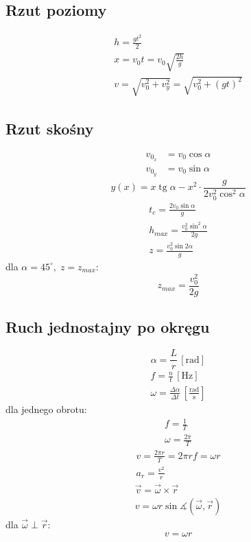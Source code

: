 \documentclass{article}
\numberwithin{equation}{section}
\DeclareMathOperator{\tg}{tg}
\newcommand{\unit}[1]{\, \left[\mathrm{#1}\right]}
\begin{document}
    \subsection{Rzut poziomy}
      \begin{gather}
        h = \frac{gt^2}{2}\\
        x = v_0t = v_0\sqrt{\frac{2h}{g}}\\
        v = \sqrt{v_0^2 + v_y^2} = \sqrt{v_0^2 + (gt)^2}
      \end{gather}
    \subsection{Rzut skośny}
      \begin{align}
        v_{0_x} &= v_0\cos\alpha\\
        v_{0_y} &= v_0\sin\alpha
      \end{align}
      \begin{equation}
        y(x) = x\tg\alpha - x^2\cdot \frac{g}{2v_0^2\cos^2\alpha}
      \end{equation}
      \begin{gather}
        t_c = \frac{2v_0\sin\alpha}{g}\\
        h_{max} = \frac{v_0^2\sin^2\alpha}{2g}\\
        z = \frac{v_0^2\sin 2\alpha}{g}
      \end{gather}
      dla $\alpha = 45^\circ,\; z = z_{max}$:
      \begin{equation}
        z_{max} = \frac{v_0^2}{2g}
      \end{equation}
    \subsection{Ruch jednostajny po okręgu}
      \begin{equation}
        \alpha = \frac Lr \unit{rad}
      \end{equation}
      \begin{gather}
        f = \frac nt \unit{Hz}\\
        \omega = \frac{\Delta\alpha}{\Delta t} \unit{\frac{rad}{s}}
      \end{gather}
      dla jednego obrotu:
      \begin{gather}
        f = \frac 1T\\
        \omega = \frac{2\pi}{T}
      \end{gather}
      \begin{gather}
        v = \frac{2\pi r}{T} = 2\pi rf = \omega r\\
        a_r = \frac{v^2}{r}
      \end{gather}
      \begin{gather}
        \vec v = \vec\omega \times \vec r\\
        v = \omega r\sin\measuredangle(\vec\omega, \vec r)
      \end{gather}
      dla $\vec\omega \perp \vec r$:
      \begin{equation}
        v = \omega r
      \end{equation}
\end{document}
